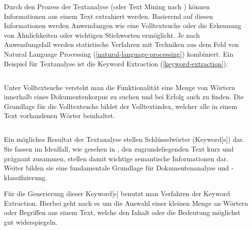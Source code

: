 
Durch den Prozess der \gls{Textanalyse} (oder Text Mining nach \cite{tan1999text}) können Informationen aus einem Text extrahiert werden. Basierend auf diesen Informationen werden Anwendungen wie eine \gls{Volltextsuche} oder die Erkennung von Ähnlichkeiten oder wichtigen Stichworten ermöglicht. Je nach Anwendungsfall werden statistische Verfahren mit Techniken aus dem Feld von \gls{Natural Language Processing} (\autoref{natural-language-processing}) kombiniert. Ein Beispiel für \gls{Textanalyse} ist die \gls{Keyword Extraction} (\autoref{keyword-extraction}). 



\subsection{}


Unter \gls{Volltextsuche} versteht man die Funktionalität eine Menge von Wörtern innerhalb eines Dokumentenkorpus zu suchen und bei Erfolg auch zu finden. Die Grundlage für die \gls{Volltextsuche} bildet der Volltextindex, welcher alle in einem Text vorhandenen Wörter beinhaltet.




\subsection{}\label{keyword-extraction}


Ein mögliches Resultat der \gls{Textanalyse} stellen Schlüsselwörter (\gls{Keyword}[s]) dar. Sie fassen im Idealfall, wie gesehen in \cite[S.~85]{Zhang2006}, den zugrundeliegenden Text kurz und prägnant zusammen, stellen damit wichtige semantische Informationen dar. Weiter bilden sie eine fundamentale Grundlage für Dokumentenanalyse und -klassifizierung.


Für die Generierung dieser \gls{Keyword}[s] benutzt man Verfahren der \gls{Keyword Extraction}. Hierbei geht nach  es \cite{hulth2004} um die Auswahl einer kleinen Menge an Wörtern oder Begriffen aus einem Text, welche den Inhalt oder die Bedeutung möglichst gut widerspiegeln.

